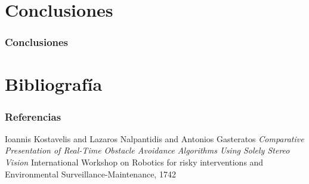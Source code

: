 \documentclass[svgnames]{beamer}
\begin{document}
\section{Conclusiones}

\begin{frame}
\frametitle{Conclusiones}


\end{frame}

\section{Bibliograf\'ia}

\begin{frame} 
\frametitle{Referencias} 

\begin{thebibliography}{10} 
\beamertemplatebookbibitems 
{}
Ioannis Kostavelis and Lazaros Nalpantidis and Antonios Gasteratos
\newblock \emph{Comparative Presentation of Real-Time Obstacle Avoidance Algorithms Using Solely Stereo Vision}
 International Workshop on Robotics for risky interventions and Environmental Surveillance-Maintenance, 1742 
\end{thebibliography} 

\end{frame} 


\end{document}
